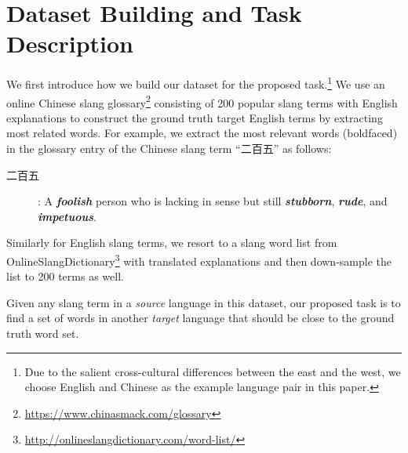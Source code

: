 \section{Dataset Building and Task Description}
We first introduce how we build our dataset for the proposed task.\footnote{{\scriptsize Due to the salient cross-cultural differences between the east and the west, we choose English and Chinese as the example language pair in this paper.}} 
We use an online Chinese slang glossary\footnote{\tiny{\url{https://www.chinasmack.com/glossary}}} consisting of  200 popular slang terms with English explanations to construct the ground truth target English terms by extracting most related words.  
For example, we extract the most relevant words (boldfaced) in the glossary entry of the Chinese slang term ``二百五'' as follows:
\begin{description}
	\item[二百五]: A \textbf{\textit{foolish}} person who is lacking in sense but still \textbf{\textit{stubborn}}, \textbf{\textit{rude}}, and \textbf{\textit{impetuous}}.
\end{description}
Similarly for English slang terms, we resort to a slang word list from OnlineSlangDictionary\footnote{\tiny{\url{http://onlineslangdictionary.com/word-list/}}} with translated explanations and then down-sample the list to 200 terms as well.  
%

Given any slang term in a \textit{source} language in this dataset, our proposed task is to find a set of words in another \textit{target} language that should be close to the ground truth word set. 
\vspace{-5pt}
